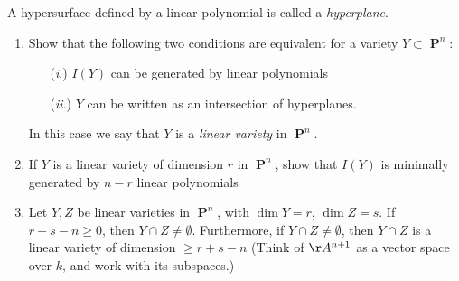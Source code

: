 \documentclass{hw_pset} %
\DeclareMathOperator{\pp}{\mathbf{P}} %
\begin{document}
\begin{solution}
    
\end{solution}

\begin{exercise}[2.11]
    A hypersurface defined by a linear polynomial is called a \emph{hyperplane}. 
        \begin{enumerate}
            \item Show that the following two conditions are equivalent for a variety $Y \subset \pp^n$: 
                \begin{itemize}
                \item[(\emph{i}.)] $I(Y)$ can be generated by linear polynomials
                \item[(\emph{ii}.)] $Y$ can be written as an intersection of hyperplanes. 
                \end{itemize}
                In this case we say that $Y$ is a \emph{linear variety} in $\pp^n$.
            \item If $Y$ is a linear variety of dimension $r$ in $\pp^n$, show that $I(Y)$ is minimally generated by $n-r$ linear polynomials 
            \item Let $Y,Z$ be linear varieties in $\pp^n$, with $\dim Y = r$, $\dim Z = s$. If $r+s-n \geq 0$, then $Y \cap Z \neq \emptyset$. Furthermore, if $Y \cap Z \neq \emptyset$, then $Y \cap Z$ is a linear variety of dimension $\geq r+s-n$ (Think of $\AA^{n+1}$ as a vector space over $k$, and work with its subspaces.)
        \end{enumerate}
\end{exercise}

\begin{solution}
    
\end{solution}
\end{document}
